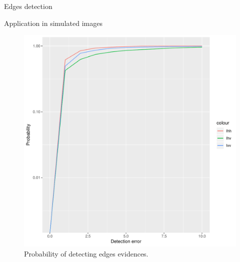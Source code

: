 \documentclass[10pt]{beamer}
\begin{document}
\begin{frame}[fragile]{Edges detection}
\begin{alertblock}{Application in simulated images} 
	\begin{figure}[hbt]
	\centering
	\includegraphics[width=.6\linewidth]{metricas_ihh_ivh_ivv_nhfc_artigos}%
	\caption{Probability of detecting edges evidences.}
\label{fig4}
\end{figure}
\end{alertblock}
\end{frame}
\end{document}
